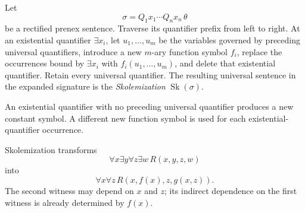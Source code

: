 \begin{definition}[Skolemization]
Let
\[
 \sigma=Q_1x_1\cdots Q_nx_n\,\theta
\]
be a rectified prenex sentence.  Traverse its quantifier prefix from left to
right.  At an existential quantifier \(\exists x_i\), let
\(u_1,\ldots,u_m\) be the variables governed by preceding universal
quantifiers, introduce a new \(m\)-ary function symbol \(f_i\), replace the
occurrences bound by \(\exists x_i\) with
\(f_i(u_1,\ldots,u_m)\), and delete that existential quantifier.  Retain every
universal quantifier.  The resulting universal sentence in the expanded
signature is the \emph{Skolemization} \(\operatorname{Sk}(\sigma)\).
\end{definition}

An existential quantifier with no preceding universal quantifier produces a
new constant symbol.  A different new function symbol is used for each
existential-quantifier occurrence.

\begin{example}
Skolemization transforms
\[
 \forall x\exists y\forall z\exists w\,R(x,y,z,w)
\]
into
\[
 \forall x\forall z\,R(x,f(x),z,g(x,z)).
\]
The second witness may depend on \(x\) and \(z\); its indirect dependence on
the first witness is already determined by \(f(x)\).
\end{example}

